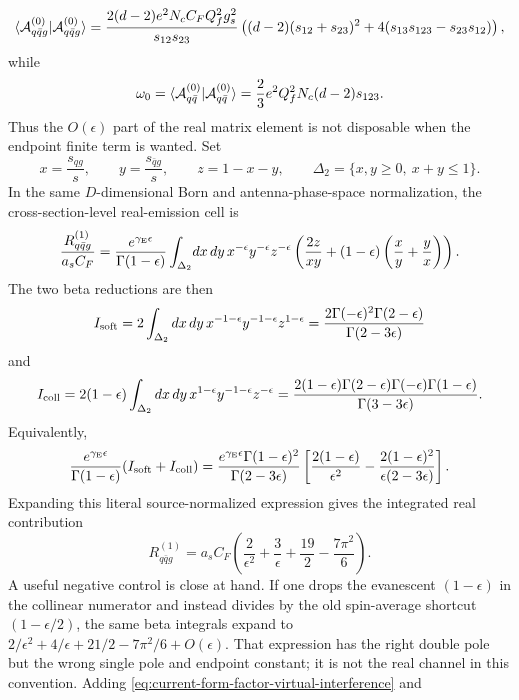 \begin{controlledapproximation}
\[
  \langle{\cal A}^{(0)}_{q\bar q g}|{\cal A}^{(0)}_{q\bar q g}\rangle
  =
  \frac{2(d-2)e^2N_c C_F Q_f^2 g_s^2}{s_{12}s_{23}}
  \left(
    (d-2)(s_{12}+s_{23})^2
    +4(s_{13}s_{123}-s_{23}s_{12})
  \right),
\]
while
\[
  \omega_0
  =
  \langle{\cal A}^{(0)}_{q\bar q}|{\cal A}^{(0)}_{q\bar q}\rangle
  =
  \frac{2}{3}e^2Q_f^2N_c(d-2)s_{123}.
\]
Thus the \(O(\epsilon)\) part of the real matrix element is not disposable
when the endpoint finite term is wanted.  Set
\[
  x=\frac{s_{qg}}{s},\qquad
  y=\frac{s_{\bar q g}}{s},\qquad
  z=1-x-y,\qquad
  \Delta_2=\{x,y\ge0,\ x+y\le1\}.
\]
In the same \(D\)-dimensional Born and antenna-phase-space normalization, the
cross-section-level real-emission cell is
\[
  \frac{R_{q\bar q g}^{(1)}}{a_s C_F}
  =
  \frac{e^{\gamma_{\rm E}\epsilon}}{\Gamma(1-\epsilon)}
  \int_{\Delta_2}\!
    dx\,dy\,
    x^{-\epsilon}y^{-\epsilon}z^{-\epsilon}
    \left(
      \frac{2z}{xy}
      +(1-\epsilon)\left(\frac{x}{y}+\frac{y}{x}\right)
    \right).
\]
The two beta reductions are then
\[
  I_{\rm soft}
  =
  2\int_{\Delta_2}dx\,dy\,
    x^{-1-\epsilon}y^{-1-\epsilon}z^{1-\epsilon}
  =
  \frac{2\Gamma(-\epsilon)^2\Gamma(2-\epsilon)}
       {\Gamma(2-3\epsilon)}
\]
and
\[
  I_{\rm coll}
  =
  2(1-\epsilon)
  \int_{\Delta_2}dx\,dy\,
    x^{1-\epsilon}y^{-1-\epsilon}z^{-\epsilon}
  =
  \frac{2(1-\epsilon)\Gamma(2-\epsilon)\Gamma(-\epsilon)
        \Gamma(1-\epsilon)}
       {\Gamma(3-3\epsilon)}.
\]
Equivalently,
\[
  \frac{e^{\gamma_{\rm E}\epsilon}}{\Gamma(1-\epsilon)}
  (I_{\rm soft}+I_{\rm coll})
  =
  \frac{e^{\gamma_{\rm E}\epsilon}\Gamma(1-\epsilon)^2}
       {\Gamma(2-3\epsilon)}
  \left[
    \frac{2(1-\epsilon)}{\epsilon^2}
    -\frac{2(1-\epsilon)^2}{\epsilon(2-3\epsilon)}
  \right].
\]
Expanding this literal source-normalized expression gives the integrated real
contribution
\begin{equation}
  R_{q\bar q g}^{(1)}
  =
  a_s C_F
  \left(
    \frac{2}{\epsilon^2}
    +\frac{3}{\epsilon}
    +\frac{19}{2}-\frac{7\pi^2}{6}
  \right).
  \label{eq:current-form-factor-real-channel}
\end{equation}
A useful negative control is close at hand.  If one drops the evanescent
\((1-\epsilon)\) in the collinear numerator and instead divides by the old
spin-average shortcut \((1-\epsilon/2)\), the same beta integrals expand to
\(2/\epsilon^2+4/\epsilon+21/2-7\pi^2/6+O(\epsilon)\).  That expression has
the right double pole but the wrong single pole and endpoint constant; it is
not the real channel in this convention.
Adding \eqref{eq:current-form-factor-virtual-interference} and

\end{controlledapproximation}
